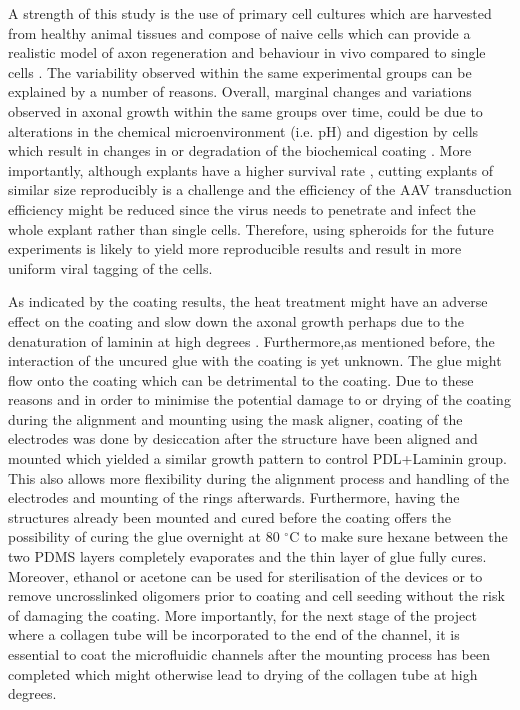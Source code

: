 \quad A strength of this study is the use of primary cell cultures which are harvested from healthy animal tissues and compose of naive cells which can provide a realistic model of axon regeneration and behaviour in vivo compared to single cells \cite{geuna2016vitro}. The variability observed within the same experimental groups can be explained by a number of reasons. Overall, marginal changes and variations observed in axonal growth within the same groups over time, could be due to alterations in the chemical microenvironment (i.e. pH) and digestion by cells which result in changes in or degradation of the biochemical coating \cite{blau2013cell}. More importantly, although explants have a higher survival rate \cite{jemni2020first}, cutting explants of similar size reproducibly is a challenge and the efficiency of the AAV transduction efficiency might be reduced since the virus needs to penetrate and infect the whole explant rather than single cells. Therefore, using spheroids for the future experiments is likely to yield more reproducible results and result in more uniform viral tagging of the cells.

\quad As indicated by the coating results, the heat treatment might have an adverse effect on the coating and slow down the axonal growth perhaps due to the denaturation of laminin at high degrees \cite{charonis1985binding}. Furthermore,as mentioned before, the interaction of the uncured glue with the coating is yet unknown. The glue might flow onto the coating which can be detrimental to the coating. Due to these reasons and in order to minimise the potential damage to or drying of the coating during the alignment and mounting using the mask aligner, coating of the electrodes was done by desiccation after the structure have been aligned and mounted which yielded a similar growth pattern to control PDL+Laminin group. This also allows more flexibility during the alignment process and handling of the electrodes and mounting of the rings afterwards. Furthermore, having the structures already been mounted and cured before the coating offers the possibility of curing the glue overnight at 80 $^{\circ}$C to make sure hexane between the two PDMS layers completely evaporates and the thin layer of glue fully cures.  Moreover, ethanol or acetone can be used for sterilisation of the devices or to remove uncrosslinked oligomers prior to coating and cell seeding without the risk of damaging the coating. More importantly, for the next stage of the project where a collagen tube will be incorporated to the end of the channel, it is essential to coat the microfluidic channels after the mounting process has been completed which might otherwise lead to drying of the collagen tube at high degrees. 

